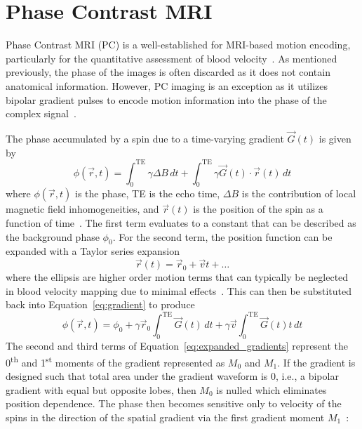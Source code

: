 \section{Phase Contrast MRI}\label{sec:phase_contrast}
Phase Contrast MRI (PC) is a well-established for MRI-based motion encoding, particularly for the quantitative assessment of blood velocity~\cite{bryantMeasurementFlowNMR1984}. As mentioned previously, the phase of the images is often discarded as it does not contain anatomical information. However, PC imaging is an exception as it utilizes bipolar gradient pulses to encode motion information into the phase of the complex signal~\cite{bryantMeasurementFlowNMR1984}. 

The phase accumulated by a spin due to a time-varying gradient $\vec{G}(t)$ is given by
\begin{equation}
    \phi(\vec{r}, t) = \int_{0}^{\text{TE}} \gamma \Delta B\, dt + \int_{0}^{\text{TE}} \gamma \vec{G}(t) \cdot \vec{r}(t)\, dt
    \label{eq:gradient}
\end{equation}
where $\phi(\vec{r}, t)$ is the phase, TE is the echo time, $\Delta B$ is the contribution of local magnetic field inhomogeneities, and $\vec{r}(t)$ is the position of the spin as a function of time~\cite{nayakCardiovascularMagneticResonance2015, lotzCardiovascularFlowMeasurement2002}. The first term evaluates to a constant that can be described as the background phase $\phi_0$. For the second term, the position function can be expanded with a Taylor series expansion 
\begin{equation}
    \vec{r}(t) = \vec{r}_0 + \vec{v}t + \dots
    \label{eq:taylor_exp}
\end{equation}
where the ellipsis are higher order motion terms that can typically be neglected in blood velocity mapping due to minimal effects~\cite{bryantMeasurementFlowNMR1984}. This can then be substituted back into Equation~\ref{eq:gradient} to produce
\begin{equation}
    \phi(\vec{r}, t) = \phi_0 + \gamma\vec{r}_0\int_{0}^{\text{TE}} \vec{G}(t)\,dt + \gamma\vec{v}\int_{0}^{\text{TE}} \vec{G}(t) t \,dt
    \label{eq:expanded_gradients}
\end{equation}
The second and third terms of Equation~\ref{eq:expanded_gradients} represent the 0\textsuperscript{th} and  1\textsuperscript{st} moments of the gradient represented as $M_0$ and $M_1$. If the gradient is designed such that total area under the gradient waveform is 0, i.e., a bipolar gradient with equal but opposite lobes, then $M_0$ is nulled which eliminates position dependence. The phase then becomes sensitive only to velocity of the spins in the direction of the spatial gradient via the first gradient moment $M_1$~\cite{nayakCardiovascularMagneticResonance2015, lotzCardiovascularFlowMeasurement2002}:
